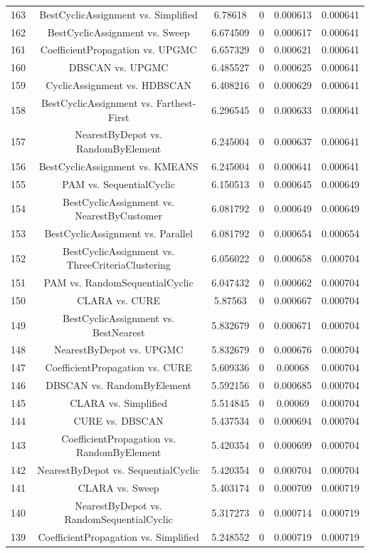 \documentclass[a4paper,10pt]{article}
\begin{document}
\begin{landscape}
\begin{table}[!htp]
\begin{tabular}{cccccc}
163&BestCyclicAssignment vs. Simplified&6.78618&0&0.000613&0.000641\\
162&BestCyclicAssignment vs. Sweep&6.674509&0&0.000617&0.000641\\
161&CoefficientPropagation vs. UPGMC&6.657329&0&0.000621&0.000641\\
160&DBSCAN vs. UPGMC&6.485527&0&0.000625&0.000641\\
159&CyclicAssignment vs. HDBSCAN&6.408216&0&0.000629&0.000641\\
158&BestCyclicAssignment vs. Farthest-First&6.296545&0&0.000633&0.000641\\
157&NearestByDepot vs. RandomByElement&6.245004&0&0.000637&0.000641\\
156&BestCyclicAssignment vs. KMEANS&6.245004&0&0.000641&0.000641\\
155&PAM vs. SequentialCyclic&6.150513&0&0.000645&0.000649\\
154&BestCyclicAssignment vs. NearestByCustomer&6.081792&0&0.000649&0.000649\\
153&BestCyclicAssignment vs. Parallel&6.081792&0&0.000654&0.000654\\
152&BestCyclicAssignment vs. ThreeCriteriaClustering&6.056022&0&0.000658&0.000704\\
151&PAM vs. RandomSequentialCyclic&6.047432&0&0.000662&0.000704\\
150&CLARA vs. CURE&5.87563&0&0.000667&0.000704\\
149&BestCyclicAssignment vs. BestNearest&5.832679&0&0.000671&0.000704\\
148&NearestByDepot vs. UPGMC&5.832679&0&0.000676&0.000704\\
147&CoefficientPropagation vs. CURE&5.609336&0&0.00068&0.000704\\
146&DBSCAN vs. RandomByElement&5.592156&0&0.000685&0.000704\\
145&CLARA vs. Simplified&5.514845&0&0.00069&0.000704\\
144&CURE vs. DBSCAN&5.437534&0&0.000694&0.000704\\
143&CoefficientPropagation vs. RandomByElement&5.420354&0&0.000699&0.000704\\
142&NearestByDepot vs. SequentialCyclic&5.420354&0&0.000704&0.000704\\
141&CLARA vs. Sweep&5.403174&0&0.000709&0.000719\\
140&NearestByDepot vs. RandomSequentialCyclic&5.317273&0&0.000714&0.000719\\
139&CoefficientPropagation vs. Simplified&5.248552&0&0.000719&0.000719\\

\end{tabular}
\end{table}
\end{landscape}
\end{document}
